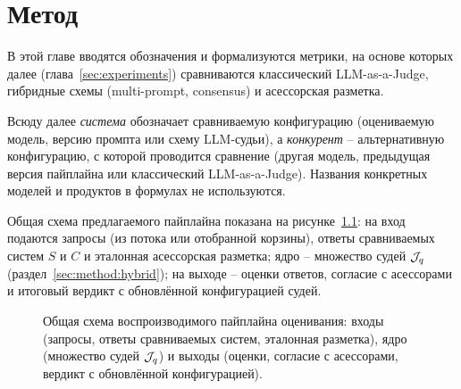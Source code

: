 \chapter{Метод}
\label{sec:method}

В этой главе вводятся обозначения и формализуются метрики, на основе
которых далее (глава~\ref{sec:experiments}) сравниваются классический
LLM-as-a-Judge, гибридные схемы (multi-prompt, consensus) и асессорская
разметка.

Всюду далее \emph{система} обозначает сравниваемую конфигурацию
(оцениваемую модель, версию промпта или схему LLM-судьи), а
\emph{конкурент} -- альтернативную конфигурацию, с которой проводится
сравнение (другая модель, предыдущая версия пайплайна или
классический LLM-as-a-Judge).
Названия конкретных моделей и продуктов в формулах не используются.

Общая схема предлагаемого пайплайна показана на
рисунке~\ref{fig:pipeline-overview}: на вход подаются запросы (из потока
или отобранной корзины), ответы сравниваемых систем $S$ и $C$ и
эталонная асессорская разметка; ядро -- множество судей $\mathcal{J}_q$
(раздел~\ref{sec:method:hybrid}); на выходе -- оценки ответов, согласие с
асессорами и итоговый вердикт с обновлённой конфигурацией судей.

\begin{figure}[htbp]
    \centering
    \caption{Общая схема воспроизводимого пайплайна оценивания:
    входы (запросы, ответы сравниваемых систем, эталонная разметка),
    ядро (множество судей $\mathcal{J}_q$) и выходы (оценки, согласие с
    асессорами, вердикт с обновлённой конфигурацией).}
    \label{fig:pipeline-overview}
\end{figure}

